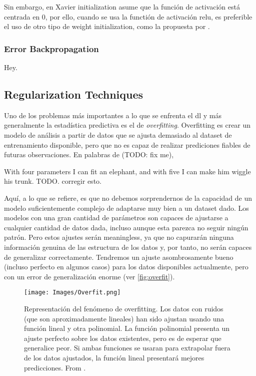 Sin embargo, en Xavier initialization asume que la función de activación está
centrada en 0, por ello, cuando se usa la functión de activación \gls{relu}, es
preferible el uso de otro tipo de weight initialization, como la propuesta por
.

\subsubsection{Error Backpropagation}
Hey.

\subsection{Regularization Techniques}

Uno de los problemas más importantes a lo que se enfrenta el \gls{dl} y más
generalmente la estadística predictiva es el de
\emph{overfitting}. Overfitting es crear un modelo de
análisis a partir de datos que se ajusta demasiado al dataset de entrenamiento
disponible, pero que no es capaz de realizar prediciones fiables de futuras
observaciones. En palabras de  (TODO:
fix me),
\begin{quoteBox}
  With four parameters I can fit an elephant, and with five I can make him
  wiggle his trunk.
  \tcblower{}TODO. corregir esto.
\end{quoteBox}

Aquí, a lo que se refiere, es que no debemos sorprendernos de la capacidad de
un modelo suficientemente complejo de adaptarse muy bien a un dataset dado. Los
modelos con una gran cantidad de parámetros son capaces de ajustarse a
cualquier cantidad de datos dada, incluso aunque esta parezca no seguir ningún
patrón. Pero estos ajustes serán meaningless, ya que no capurarán ninguna
información genuina de las estructura de los datos y, por tanto, no serán
capaces de generalizar correctamente. Tendremos un ajuste asombrosamente bueno
(incluso perfecto en algunos casos) para los datos disponibles actualmente,
pero con un error de generalización enorme (ver \vref{fig:overfit}).

\begin{figure}[ht]
  \centering
  \texttt{[image: Images/Overfit.png]}
  \caption[Representación del fenómeno de overfitting.]{Representación del
    fenómeno de overfitting. Los datos con ruidos (que son aproximadamente
    lineales) han sido ajustan usando una función lineal y otra polinomial. La
    función polinomial presenta un ajuste perfecto sobre los datos existentes,
    pero es de esperar que generalice peor. Si ambas funciones se usaran para
    extrapolar fuera de los datos ajustados, la función lineal presentará
    mejores predicciones. From
    .}\label{fig:overfit}
\end{figure}

